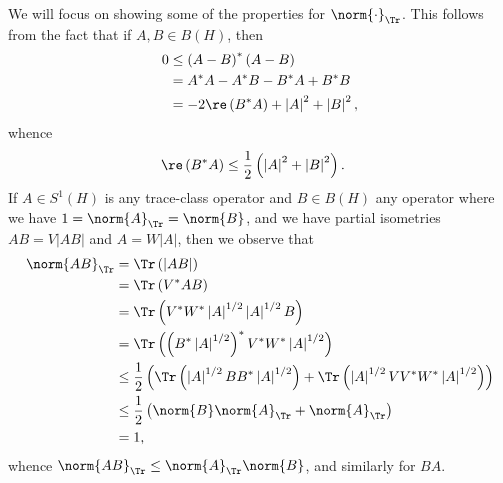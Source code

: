 \documentclass[10pt]{mypackage}
\begin{document}
We will focus on showing some of the properties for $\norm{\cdot}_{\Tr}$. This follows from the fact that if $A,B\in B\left( H \right)$, then
\begin{align*}
  0 &\leq \left( A-B \right)^{\ast}\left( A-B \right) \\
  &= A^{\ast}A - A^{\ast}B - B^{\ast}A + B^{\ast}B\\
                                              &= -2\re\left( B^{\ast}A \right) + \left\vert A \right\vert^2 + \left\vert B \right\vert^2,
\end{align*}
whence
\begin{align*}
  \re\left( B^{\ast}A \right) &\leq \frac{1}{2}\left( \left\vert A \right\vert^2 + \left\vert B \right\vert^2 \right).
\end{align*}
If $A\in S^1\left( H \right)$ is any trace-class operator and $B\in B(H)$ any operator where we have $1 = \norm{A}_{\Tr} = \norm{B}$, and we have partial isometries $AB = V\left\vert AB \right\vert$ and $A = W\left\vert A \right\vert$, then we observe that
\begin{align*}
  \norm{AB}_{\Tr} &= \Tr\left( \left\vert AB \right\vert \right)\\
                  &= \Tr\left( V^{\ast}AB \right)\\
                  &= \Tr\left( V^{\ast}W^{\ast}\left\vert A \right\vert^{1/2}\left\vert A \right\vert^{1/2}B \right)\\
                  &= \Tr\left( \left( B^{\ast}\left\vert A \right\vert^{1/2} \right)^{\ast}V^{\ast}W^{\ast}\left\vert A \right\vert^{1/2} \right)\\
                  &\leq \frac{1}{2}\left( \Tr\left( \left\vert A \right\vert^{1/2}BB^{\ast}\left\vert A \right\vert^{1/2} \right) + \Tr\left( \left\vert A \right\vert^{1/2}VV^{\ast}W^{\ast}\left\vert A \right\vert^{1/2} \right) \right)\\
                  &\leq \frac{1}{2}\left( \norm{B}\norm{A}_{\Tr} + \norm{A}_{\Tr} \right)\\
                  &= 1,
\end{align*}
whence $\norm{AB}_{\Tr}\leq \norm{A}_{\Tr}\norm{B}$, and similarly for $BA$.
\end{document}
